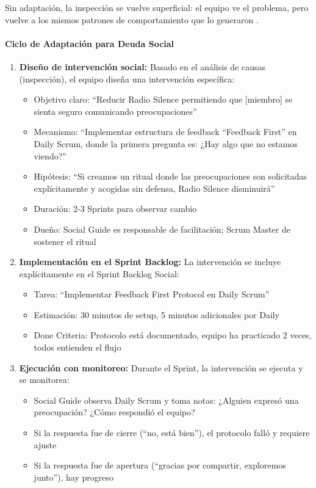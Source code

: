 Sin adaptación, la inspección se vuelve superficial: el equipo ve el problema, pero vuelve a los mismos patrones de comportamiento que lo generaron \cite{saeeda2024nontechnicaldebt}.

\paragraph{Ciclo de Adaptación para Deuda Social}

\begin{enumerate}

\item \textbf{Diseño de intervención social:} Basado en el análisis de causas (inspección), el equipo diseña una intervención específica:
\begin{itemize}
\item Objetivo claro: ``Reducir Radio Silence permitiendo que [miembro] se sienta seguro comunicando preocupaciones''
\item Mecanismo: ``Implementar estructura de feedback ``Feedback First'' en Daily Scrum, donde la primera pregunta es: ¿Hay algo que no estamos viendo?''
\item Hipótesis: ``Si creamos un ritual donde las preocupaciones son solicitadas explícitamente y acogidas sin defensa, Radio Silence disminuirá''
\item Duración: 2-3 Sprints para observar cambio
\item Dueño: Social Guide es responsable de facilitación; Scrum Master de sostener el ritual
\end{itemize}

\item \textbf{Implementación en el Sprint Backlog:} La intervención se incluye explícitamente en el Sprint Backlog Social:
\begin{itemize}
\item Tarea: ``Implementar Feedback First Protocol en Daily Scrum''
\item Estimación: 30 minutos de setup, 5 minutos adicionales por Daily
\item Done Criteria: Protocolo está documentado, equipo ha practicado 2 veces, todos entienden el flujo
\end{itemize}

\item \textbf{Ejecución con monitoreo:} Durante el Sprint, la intervención se ejecuta y se monitorea:
\begin{itemize}
\item Social Guide observa Daily Scrum y toma notas: ¿Alguien expresó una preocupación? ¿Cómo respondió el equipo?
\item Si la respuesta fue de cierre (``no, está bien''), el protocolo falló y requiere ajuste
\item Si la respuesta fue de apertura (``gracias por compartir, exploremos junto''), hay progreso
\end{itemize}


\end{enumerate}
